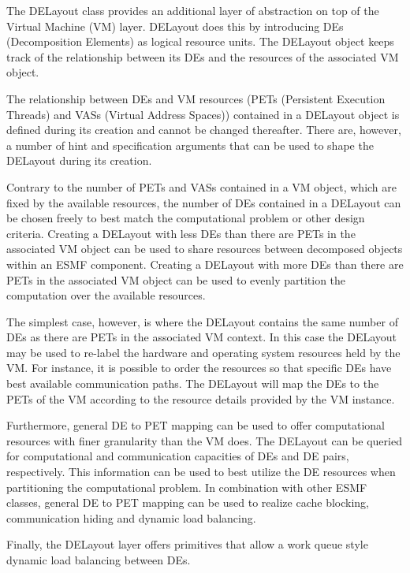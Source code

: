 
The DELayout class provides an additional layer of abstraction on top of the Virtual Machine (VM) layer. DELayout does this by introducing DEs (Decomposition Elements) as logical resource units. The DELayout object keeps track of the relationship between its DEs and the resources of the associated VM object. 

The relationship between DEs and VM resources (PETs (Persistent Execution Threads) and VASs (Virtual Address Spaces)) contained in a DELayout object is defined during its creation and cannot be changed thereafter. There are, however, a number of hint and specification arguments that can be used to shape the DELayout during its creation.

Contrary to the number of PETs and VASs contained in a VM object, which are fixed by the available resources, the number of DEs contained in a DELayout can be chosen freely to best match the computational problem or other design criteria. Creating a DELayout with less DEs than there are PETs in the associated VM object can be used to share resources between decomposed objects within an ESMF component. Creating a DELayout with more DEs than there are PETs in the associated VM object can be used to evenly partition the computation over the available resources.

The simplest case, however, is where the DELayout contains the same number of DEs as there are PETs in the associated VM context. In this case the DELayout may be used to re-label the hardware and operating system resources held by the VM. For instance, it is possible to order the resources so that specific DEs have best available communication paths. The DELayout will map the DEs to the PETs of the VM according to the resource details provided by the VM instance. 

Furthermore, general DE to PET mapping can be used to offer computational resources with finer granularity than the VM does. The DELayout can be queried for computational and communication capacities of DEs and DE pairs, respectively. This information can be used to best utilize the DE resources when partitioning the computational problem. In combination with other ESMF classes, general DE to PET mapping can be used to realize cache blocking, communication hiding and dynamic load balancing.

Finally, the DELayout layer offers primitives that allow a work queue style dynamic load balancing between DEs.

